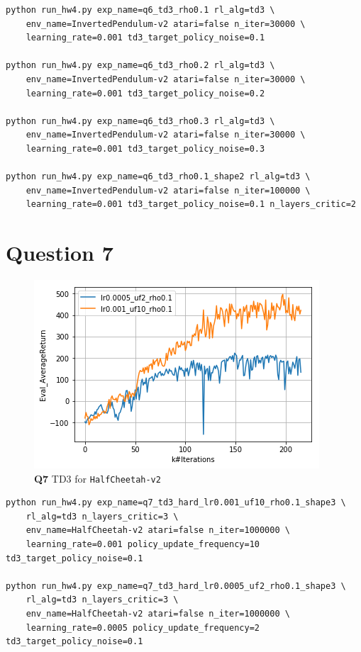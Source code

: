 \documentclass[11pt]{article}
\begin{document}
\begin{verbatim}
python run_hw4.py exp_name=q6_td3_rho0.1 rl_alg=td3 \
    env_name=InvertedPendulum-v2 atari=false n_iter=30000 \
    learning_rate=0.001 td3_target_policy_noise=0.1

python run_hw4.py exp_name=q6_td3_rho0.2 rl_alg=td3 \
    env_name=InvertedPendulum-v2 atari=false n_iter=30000 \
    learning_rate=0.001 td3_target_policy_noise=0.2

python run_hw4.py exp_name=q6_td3_rho0.3 rl_alg=td3 \
    env_name=InvertedPendulum-v2 atari=false n_iter=30000 \
    learning_rate=0.001 td3_target_policy_noise=0.3

python run_hw4.py exp_name=q6_td3_rho0.1_shape2 rl_alg=td3 \
    env_name=InvertedPendulum-v2 atari=false n_iter=100000 \
    learning_rate=0.001 td3_target_policy_noise=0.1 n_layers_critic=2
\end{verbatim}

\clearpage


\section{Question 7}
\label{sec:orgb7ed1cd}

\begin{figure}[htbp]
\centering
\includegraphics[width=.9\linewidth]{./7.png}
\caption{\textbf{Q7} TD3 for \texttt{HalfCheetah-v2}}
\end{figure}

\begin{verbatim}
python run_hw4.py exp_name=q7_td3_hard_lr0.001_uf10_rho0.1_shape3 \
    rl_alg=td3 n_layers_critic=3 \
    env_name=HalfCheetah-v2 atari=false n_iter=1000000 \
    learning_rate=0.001 policy_update_frequency=10 td3_target_policy_noise=0.1

python run_hw4.py exp_name=q7_td3_hard_lr0.0005_uf2_rho0.1_shape3 \
    rl_alg=td3 n_layers_critic=3 \
    env_name=HalfCheetah-v2 atari=false n_iter=1000000 \
    learning_rate=0.0005 policy_update_frequency=2 td3_target_policy_noise=0.1
\end{verbatim}

\clearpage
\end{document}
